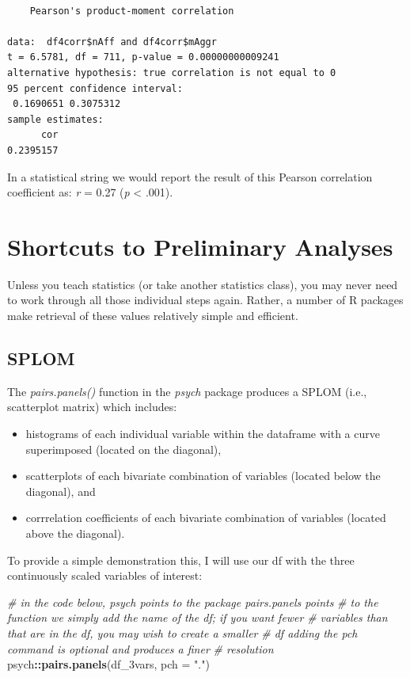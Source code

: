 \documentclass[
  11pt,
]{book}
\newenvironment{Shaded}{\begin{snugshade}}{\end{snugshade}}
\newcommand{\AttributeTok}[1]{\textcolor[rgb]{0.27,0.27,0.27}{#1}}
\newcommand{\CommentTok}[1]{\textcolor[rgb]{0.37,0.37,0.37}{\textit{#1}}}
\newcommand{\FunctionTok}[1]{\textcolor[rgb]{0.27,0.27,0.27}{\textbf{#1}}}
\newcommand{\NormalTok}[1]{#1}
\newcommand{\SpecialCharTok}[1]{\textcolor[rgb]{0.43,0.43,0.43}{\textbf{#1}}}
\newcommand{\StringTok}[1]{\textcolor[rgb]{0.5,0.5,0.5}{#1}}
\providecommand{\tightlist}{%
  \setlength{\itemsep}{0pt}\setlength{\parskip}{0pt}}
\begin{document}
\begin{verbatim}

    Pearson's product-moment correlation

data:  df4corr$nAff and df4corr$mAggr
t = 6.5781, df = 711, p-value = 0.00000000009241
alternative hypothesis: true correlation is not equal to 0
95 percent confidence interval:
 0.1690651 0.3075312
sample estimates:
      cor 
0.2395157 
\end{verbatim}

In a statistical string we would report the result of this Pearson correlation coefficient as: \emph{r} = 0.27 (\emph{p} \textless{} .001).

\hypertarget{shortcuts-to-preliminary-analyses}{%
\section{Shortcuts to Preliminary Analyses}\label{shortcuts-to-preliminary-analyses}}

Unless you teach statistics (or take another statistics class), you may never need to work through all those individual steps again. Rather, a number of R packages make retrieval of these values relatively simple and efficient.

\hypertarget{splom}{%
\subsection{SPLOM}\label{splom}}

The \emph{pairs.panels()} function in the \emph{psych} package produces a SPLOM (i.e., scatterplot matrix) which includes:

\begin{itemize}
\tightlist
\item
  histograms of each individual variable within the dataframe with a curve superimposed (located on the diagonal),
\item
  scatterplots of each bivariate combination of variables (located below the diagonal), and
\item
  corrrelation coefficients of each bivariate combination of variables (located above the diagonal).
\end{itemize}

To provide a simple demonstration this, I will use our df with the three continuously scaled variables of interest:

\begin{Shaded}
\begin{Highlighting}[]
\CommentTok{\# in the code below, psych points to the package pairs.panels points}
\CommentTok{\# to the function we simply add the name of the df; if you want fewer}
\CommentTok{\# variables than that are in the df, you may wish to create a smaller}
\CommentTok{\# df adding the pch command is optional and produces a finer}
\CommentTok{\# resolution}
\NormalTok{psych}\SpecialCharTok{::}\FunctionTok{pairs.panels}\NormalTok{(df\_3vars, }\AttributeTok{pch =} \StringTok{"."}\NormalTok{)}
\end{Highlighting}
\end{Shaded}
\end{document}
